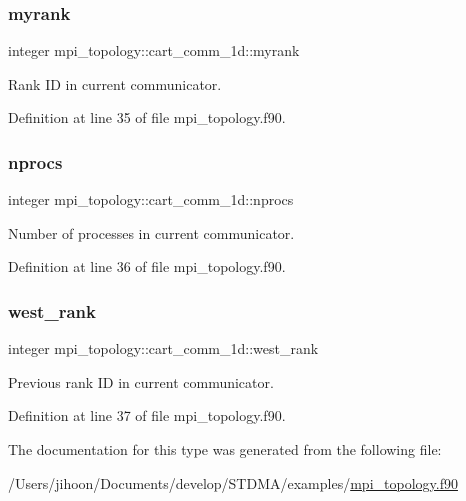 \subsubsection{\texorpdfstring{myrank}{myrank}}
{\footnotesize\ttfamily integer mpi\+\_\+topology\+::cart\+\_\+comm\+\_\+1d\+::myrank}



Rank ID in current communicator. 



Definition at line 35 of file mpi\+\_\+topology.\+f90.

\mbox{\label{structmpi__topology_1_1cart__comm__1d_adf78d1be6ca59cada6cc444edde4c3fc}} 
\subsubsection{\texorpdfstring{nprocs}{nprocs}}
{\footnotesize\ttfamily integer mpi\+\_\+topology\+::cart\+\_\+comm\+\_\+1d\+::nprocs}



Number of processes in current communicator. 



Definition at line 36 of file mpi\+\_\+topology.\+f90.

\mbox{\label{structmpi__topology_1_1cart__comm__1d_a63baa1f74126ffda0b67af1c487dcd45}} 
\subsubsection{\texorpdfstring{west\_rank}{west\_rank}}
{\footnotesize\ttfamily integer mpi\+\_\+topology\+::cart\+\_\+comm\+\_\+1d\+::west\+\_\+rank}



Previous rank ID in current communicator. 



Definition at line 37 of file mpi\+\_\+topology.\+f90.



The documentation for this type was generated from the following file\+:\begin{DoxyCompactItemize}
\item 
/\+Users/jihoon/\+Documents/develop/\+S\+T\+D\+M\+A/examples/\mbox{\hyperlink{mpi__topology_8f90}{mpi\+\_\+topology.\+f90}}\end{DoxyCompactItemize}
